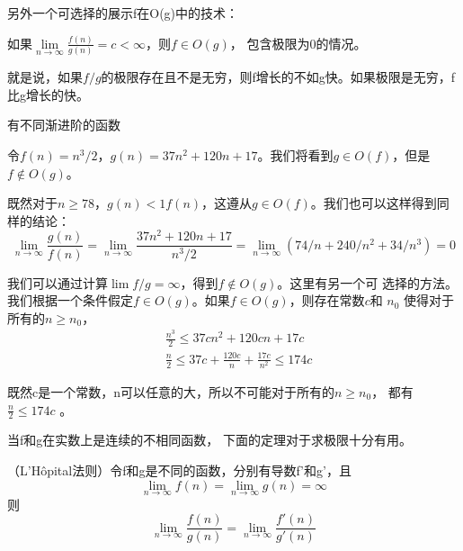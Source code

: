另外一个可选择的展示f在O(g)中的技术：
\begin{lemma}
如果$\lim\limits_{n\rightarrow \infty}\frac{f(n)}{g(n)}=c<\infty$，则$f\in O(g)$，
包含极限为0的情况。
\end{lemma}

就是说，如果$f/g$的极限存在且不是无穷，则f增长的不如g快。如果极限是无穷，f比g增长的快。

\begin{example}
有不同渐进阶的函数

令$f(n)=n^3/2$，$g(n)=37n^2+120n+17$。我们将看到$g\in O(f)$，但是$f\notin O(g)$。

既然对于$n\geq 78$，$g(n)<1f(n)$，这遵从$g\in O(f)$。我们也可以这样得到同样的结论：
\begin{displaymath}
\lim\limits_{n\rightarrow \infty}\frac{g(n)}{f(n)}=
\lim\limits_{n\rightarrow \infty}\frac{37n^2+120n+17}{n^3/2}=
\lim\limits_{n\rightarrow \infty}(74/n+240/n^2+34/n^3)=0
\end{displaymath}

我们可以通过计算$\lim f/g =\infty$，得到$f\notin O(g)$。这里有另一个可
选择的方法。我们根据一个条件假定$f\in O(g)$。如果$f\in O(g)$，则存在常数$c$和
$n_0$ 使得对于所有的$n\geq n_0$，
\begin{displaymath}
\begin{aligned}
&\frac{n^3}{2}\leq 37cn^2+120cn+17c\\
&\frac{n}{2}\leq 37c+\frac{120c}{n}+\frac{17c}{n^2}\leq 174c
\end{aligned}
\end{displaymath}

既然c是一个常数，n可以任意的大，所以不可能对于所有的$n\geq n_0$，
都有$\frac{n}{2}\leq 174c$ 。

\end{example}

当f和g在实数上是连续的不相同函数，  下面的定理对于求极限十分有用。

\begin{lemma}\label{Lemma:L'Hopital}
（L'H\^{o}pital法则）令f和g是不同的函数，分别有导数f'和g'，且
\begin{displaymath}
\lim\limits_{n\rightarrow \infty}f(n)=\lim\limits_{n\rightarrow \infty} g(n)= \infty
\end{displaymath}
则
\begin{displaymath}
\lim\limits_{n\rightarrow \infty} \frac{f(n)}{g(n)} =\lim\limits_{n\rightarrow \infty} \frac{f'(n)}{g'(n)}
\end{displaymath}

\end{lemma}

